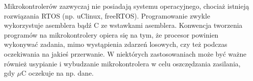 Mikrokontrolerów zazwyczaj nie posiadają systemu operacyjnego, chociaż istnieją rozwiązania RTOS (np. uClinux, freeRTOS). Programowanie zwykle wykorzystuje asemblera bądź C ze wstawkami asemblera. Konwencja tworzenia programów na mikrokontrolery opiera się na tym, że procesor powinien wykonywać zadania, mimo wystąpienia zdarzeń losowych, czy też podczas oczekiwania na jakieś przerwanie. W niektórych zastosowaniach może być ważne również usypianie i wybudzanie mikrokontrolera w celu oszczędzania zasilania, gdy $\mu$C oczekuje na np. dane.